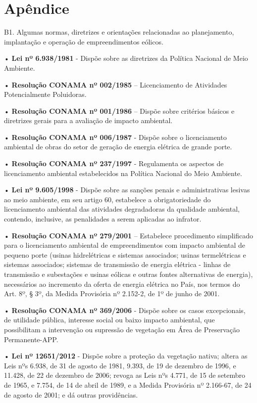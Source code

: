 \documentclass[
  oneside]{scrbook}
\begin{document}
\hypertarget{apuxeandice-1}{%
\chapter{Apêndice}\label{apuxeandice-1}}

B1. Algumas normas, diretrizes e orientações relacionadas ao planejamento, implantação e operação de empreendimentos eólicos.

• \textbf{Lei nº 6.938/1981} - Dispõe sobre as diretrizes da Política Nacional de Meio Ambiente.

• \textbf{Resolução CONAMA nº 002/1985} -- Licenciamento de Atividades Potencialmente Poluidoras.

• \textbf{Resolução CONAMA nº 001/1986} -- Dispõe sobre critérios básicos e diretrizes gerais para a avaliação de impacto ambiental.

• \textbf{Resolução CONAMA nº 006/1987} - Dispõe sobre o licenciamento ambiental de obras do setor de geração de energia elétrica de grande porte.

• \textbf{Resolução CONAMA nº 237/1997} - Regulamenta os aspectos de licenciamento ambiental estabelecidos na Política Nacional do Meio Ambiente.

• \textbf{Lei nº 9.605/1998} - Dispõe sobre as sanções penais e administrativas lesivas ao meio ambiente, em seu artigo 60, estabelece a obrigatoriedade do licenciamento ambiental das atividades degradadoras da qualidade ambiental, contendo, inclusive, as penalidades a serem aplicadas ao infrator.

• \textbf{Resolução CONAMA nº 279/2001} -- Estabelece procedimento simplificado para o licenciamento ambiental de empreendimentos com impacto ambiental de pequeno porte (usinas hidrelétricas e sistemas associados; usinas termelétricas e sistemas associados; sistemas de transmissão de energia elétrica - linhas de transmissão e subestações e usinas eólicas e outras fontes alternativas de energia), necessários ao incremento da oferta de energia elétrica no País, nos termos do Art. 8º, § 3º, da Medida Provisória nº 2.152-2, de 1º de junho de 2001.

• \textbf{Resolução CONAMA nº 369/2006} - Dispõe sobre os casos excepcionais, de utilidade pública, interesse social ou baixo impacto ambiental, que possibilitam a intervenção ou supressão de vegetação em Área de Preservação Permanente-APP.

• \textbf{Lei nº 12651/2012} - Dispõe sobre a proteção da vegetação nativa; altera as Leis nºs 6.938, de 31 de agosto de 1981, 9.393, de 19 de dezembro de 1996, e 11.428, de 22 de dezembro de 2006; revoga as Leis nºs 4.771, de 15 de setembro de 1965, e 7.754, de 14 de abril de 1989, e a Medida Provisória nº 2.166-67, de 24 de agosto de 2001; e dá outras providências.
\end{document}
